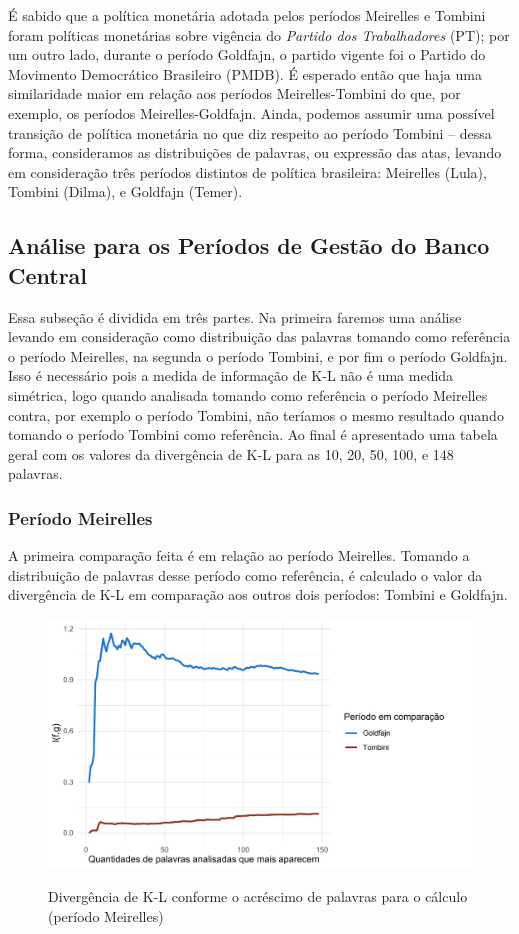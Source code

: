 É sabido que a política monetária adotada pelos períodos Meirelles e Tombini foram políticas monetárias sobre vigência do \textit{Partido dos Trabalhadores} (PT); por um outro lado, durante o período Goldfajn, o partido vigente foi o Partido do Movimento Democrático Brasileiro (PMDB). É esperado então que haja uma similaridade maior em relação aos períodos Meirelles-Tombini do que, por exemplo, os períodos Meirelles-Goldfajn. Ainda, podemos assumir uma possível transição de política monetária no que diz respeito ao período Tombini -- dessa forma, consideramos as distribuições de palavras, ou expressão das atas, levando em consideração três períodos distintos de política brasileira: Meirelles (Lula), Tombini (Dilma), e Goldfajn (Temer).

\subsection{Análise para os Períodos de Gestão do Banco Central}

Essa subseção é dividida em três partes. Na primeira faremos uma análise levando em consideração como distribuição das palavras tomando como referência o período Meirelles, na segunda o período Tombini, e por fim o período Goldfajn. Isso é necessário pois a medida de informação de K-L não é uma medida simétrica, logo quando analisada tomando como referência o período Meirelles contra, por exemplo o período Tombini, não teríamos o mesmo resultado quando tomando o período Tombini como referência. Ao final é apresentado uma tabela geral com os valores da divergência de K-L para as 10, 20, 50, 100, e 148 palavras.

\subsubsection*{Período Meirelles}

A primeira comparação feita é em relação ao período Meirelles. Tomando a distribuição de palavras desse período como referência, é calculado o valor da divergência de K-L em comparação aos outros dois períodos: Tombini e Goldfajn.

\begin{figure}[!h]
    \centering
    \caption{Divergência de K-L conforme o acréscimo de palavras para o cálculo (período Meirelles)}
    \includegraphics[width=\textwidth]{capitulos/figures/klmeirelles.pdf}
    \label{fig:klmeirelles}
\end{figure}

